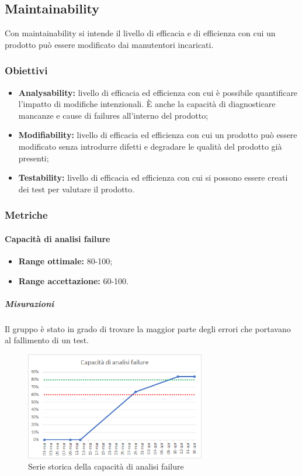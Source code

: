 			
	\subsection{Maintainability}
		Con maintainability si intende il livello di efficacia e di efficienza con cui un prodotto può essere modificato dai manutentori incaricati.
		\subsubsection{Obiettivi}
		\begin{itemize}
			\item {\textbf{Analysability:} livello di efficacia ed efficienza con cui è possibile quantificare l'impatto di modifiche intenzionali. È anche la capacità di diagnosticare mancanze e cause di failures all'interno del prodotto; }
			\item{\textbf{Modifiability:} livello di efficacia ed efficienza con cui un prodotto può essere modificato senza introdurre difetti e degradare le qualità del prodotto già presenti;}
			\item{\textbf{Testability:} livello di efficacia ed efficienza con cui si possono essere creati dei test per valutare il prodotto.}
		\end{itemize}
		\subsubsection{Metriche}
			\paragraph{Capacità di analisi failure} \Spazio
			\begin{itemize}
				\item {\textbf{Range ottimale:} 80-100;}
				\item {\textbf{Range accettazione:} 60-100.}
			\end{itemize} 
		     \subparagraph{Misurazioni}
		     Il gruppo è stato in grado di trovare la maggior parte degli errori che portavano al fallimento di un test.
		    \begin{figure}[H]
		    	\centering 
		    	\includegraphics[width=0.7\textwidth]{Images/cap.png}
		    	\caption{Serie storica della capacità di analisi failure}
		    	\label{cap} 
		    \end{figure}
	        
